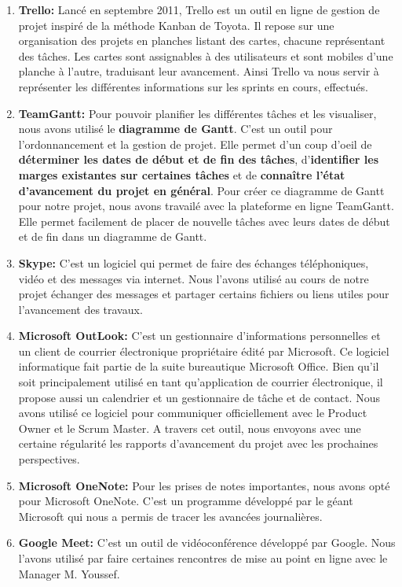         \begin{enumerate}
            \item \textbf{Trello: }Lancé en septembre 2011, Trello est un outil en ligne de gestion de projet inspiré de la méthode Kanban de Toyota. Il repose sur une organisation des projets en planches listant des cartes, chacune représentant des tâches. Les cartes sont assignables à des utilisateurs et sont mobiles d'une planche à l'autre, traduisant leur avancement. Ainsi Trello va nous servir à représenter les différentes informations sur les sprints en cours, effectués.
            \item \textbf{TeamGantt: } Pour pouvoir planifier les différentes tâches et les visualiser, nous avons utilisé le \textbf{diagramme de Gantt}. C'est un outil pour l'ordonnancement et la gestion de projet. Elle permet d'un coup d'oeil de \textbf{déterminer les dates de début et de fin des tâches}, d'\textbf{identifier les marges existantes sur certaines tâches} et de \textbf{connaître l'état d'avancement du projet en général}. Pour créer ce diagramme de Gantt pour notre projet, nous avons travailé avec la plateforme en ligne TeamGantt. Elle permet facilement de placer de nouvelle tâches avec leurs dates de début et de fin dans un diagramme de Gantt.
            \item \textbf{Skype: }C'est un logiciel qui permet de faire des échanges téléphoniques, vidéo et des messages via internet. Nous l'avons utilisé au cours de notre projet échanger des messages et partager certains fichiers ou liens utiles pour l'avancement des travaux.
            \item \textbf{Microsoft OutLook: }C'est un gestionnaire d'informations personnelles et un client de courrier électronique propriétaire édité par Microsoft. Ce logiciel informatique fait partie de la suite bureautique Microsoft Office. Bien qu'il soit principalement utilisé en tant qu'application de courrier électronique, il propose aussi un calendrier et un gestionnaire de tâche et de contact. Nous avons utilisé ce logiciel pour communiquer officiellement avec le Product Owner et le Scrum Master. A travers cet outil, nous envoyons avec une certaine régularité les rapports d'avancement du projet avec les prochaines perspectives.
            \item \textbf{Microsoft OneNote: }Pour les prises de notes importantes, nous avons opté pour Microsoft OneNote. C'est un programme développé par le géant Microsoft qui nous a permis de tracer les avancées journalières.
            \item \textbf{Google Meet: } C'est un outil de vidéoconférence développé par Google. Nous l'avons utilisé par faire certaines rencontres de mise au point en ligne avec le Manager M. Youssef. 
        \end{enumerate}

